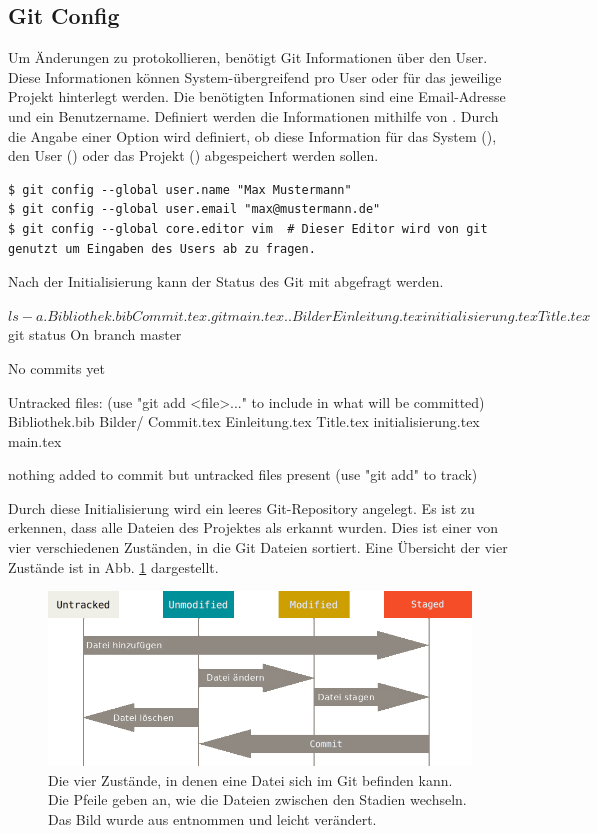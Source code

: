 \subsection{Git Config}
Um Änderungen zu protokollieren, benötigt Git Informationen über den User. Diese Informationen können System-übergreifend pro User oder für das jeweilige Projekt hinterlegt werden. Die benötigten Informationen sind eine Email-Adresse und ein Benutzername. Definiert werden die Informationen mithilfe von . Durch die Angabe einer Option wird definiert, ob diese Information für das System (), den User () oder das Projekt () abgespeichert werden sollen.
\begin{lstlisting}[breaklines=true]
$ git config --global user.name "Max Mustermann"
$ git config --global user.email "max@mustermann.de"
$ git config --global core.editor vim  # Dieser Editor wird von git genutzt um Eingaben des Users ab zu fragen.
\end{lstlisting}
Nach der Initialisierung kann der Status des Git mit  abgefragt werden.
\begin{mplisting}
$ ls -a
.   Bibliothek.bib  Commit.tex      .git                 main.tex
..  Bilder          Einleitung.tex  initialisierung.tex  Title.tex
$ git status
On branch master

No commits yet

Untracked files:
  (use "git add <file>..." to include in what will be committed)
	Bibliothek.bib
	Bilder/
	Commit.tex
	Einleitung.tex
	Title.tex
	initialisierung.tex
	main.tex

nothing added to commit but untracked files present (use "git add" to track)

\end{mplisting}
Durch diese Initialisierung wird ein leeres Git-Repository angelegt. 
Es ist zu erkennen, dass alle Dateien des Projektes als  erkannt wurden. Dies ist einer von vier verschiedenen Zuständen, in die Git Dateien sortiert. Eine Übersicht der vier Zustände ist in Abb. \ref{fig:lifecycle} dargestellt.
\begin{figure}[!h]
	\centering
	\includegraphics[width=\textwidth]{Bilder/lifecycle_de.png}
	\caption{Die vier Zustände, in denen eine Datei sich im Git befinden kann. Die Pfeile geben an, wie die Dateien zwischen den Stadien wechseln. Das Bild wurde aus \cite{ProGit} entnommen und leicht verändert.}
	\label{fig:lifecycle}
\end{figure}

